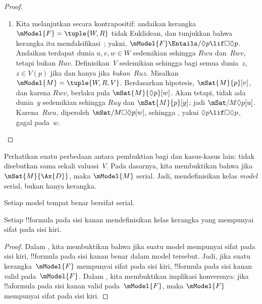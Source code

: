 \documentclass[../../../include/open-logic-section]{subfiles}
\begin{document}
\begin{proof}
\begin{enumerate}
    $Ruw$. Definisikan~$V$ sedemikian sehingga $z\in V(p)$ jika dan hanya
    jika $Ruz$ (dan $V$ dipilih sebarang dalam hal lainnya). Misalkan
    $\mModel{M}=\tuple{W,R,V}$. Menurut definisi~$V$, $\mSat{M}{p}[z]$ bagi
    semua~$z$ dengan~$Ruz$, sehingga $\mSat{M}{\Box p}[u]$. Namun,
    berdasarkan hipotesis~, $\Box p\lif\Box\Box p$ benar pada~$u$,
    sehingga $\mSat{M}{\Box\Box p}[u]$. Karena $Ruv$ dan~$Rvw$, kita
    memperoleh $\mSat{M}{p}[w]$; menurut definisi~$V$, hal ini hanya mungkin
    jika $Ruw$, seperti yang diinginkan.
  \item Kita melanjutkan secara kontrapositif: andaikan kerangka
    $\mModel{F}=\tuple{W,R}$ tidak Euklidean, dan tunjukkan bahwa kerangka itu
    memfalsifikasi~; yakni,
    $\mModel{F}\Entails/\Diamond p\lif\Box\Diamond p$. Andaikan terdapat
    dunia $u,v,w\in W$ sedemikian sehingga $Rwu$ dan~$Rwv$, tetapi bukan
    $Ruv$. Definisikan~$V$ sedemikian sehingga bagi semua dunia~$z$,
    $z\in V(p)$ jika dan hanya jika \emph{bukan}~$Ruz$. Misalkan
    $\mModel{M}=\tuple{W,R,V}$. Berdasarkan hipotesis,
    $\mSat{M}{p}[v]$, dan karena $Rwv$, berlaku pula
    $\mSat{M}{\Diamond p}[w]$. Akan tetapi, tidak ada dunia~$y$ sedemikian
    sehingga $Ruy$ dan $\mSat{M}{p}[y]$; jadi
    $\mSat/{M}{\Diamond p}[u]$. Karena~$Rwu$, diperoleh
    $\mSat/{M}{\Box\Diamond p}[w]$, sehingga , yakni
    $\Diamond p\lif\Box\Diamond p$, gagal pada~$w$.
  \end{enumerate}
\end{proof}

Perhatikan suatu perbedaan antara pembuktian bagi  dan kasus-kasus lain:
tidak disebutkan sama sekali valuasi~$V$. Pada dasarnya, kita membuktikan bahwa
jika $\mSat{M}{\Ax{D}}$, maka $\mModel{M}$ serial. Jadi, 
mendefinisikan kelas \emph{model} serial, bukan hanya kerangka.

\begin{cor}
  Setiap model tempat  benar bersifat serial.
\end{cor}

\begin{cor}
Setiap !!{formula} pada sisi kanan  mendefinisikan kelas
kerangka yang mempunyai sifat pada sisi kiri.
\end{cor}

\begin{proof}
  Dalam , kita membuktikan bahwa jika suatu model
  mempunyai sifat pada sisi kiri, !!{formula} pada sisi kanan benar dalam
  model tersebut. Jadi, jika suatu kerangka~$\mModel{F}$ mempunyai sifat pada
  sisi kiri, !!{formula} pada sisi kanan valid pada~$\mModel{F}$. Dalam
  , kita membuktikan implikasi konversnya: jika
  !!a{formula} pada sisi kanan valid pada~$\mModel{F}$, maka $\mModel{F}$
  mempunyai sifat pada sisi kiri.
\end{proof}
\end{document}
